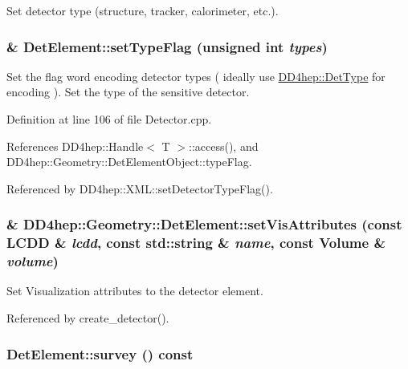 Set detector type (structure, tracker, calorimeter, etc.). \hypertarget{class_d_d4hep_1_1_geometry_1_1_det_element_a5a03e88dd7e1e3f215116f44dfca1dce}{
\subsubsection[{setTypeFlag}]{ \& DetElement::setTypeFlag (unsigned int {\em types})}}
\label{class_d_d4hep_1_1_geometry_1_1_det_element_a5a03e88dd7e1e3f215116f44dfca1dce}


Set the flag word encoding detector types ( ideally use \hyperlink{class_d_d4hep_1_1_det_type}{DD4hep::DetType} for encoding ). Set the type of the sensitive detector. 

Definition at line 106 of file Detector.cpp.

References DD4hep::Handle$<$ T $>$::access(), and DD4hep::Geometry::DetElementObject::typeFlag.

Referenced by DD4hep::XML::setDetectorTypeFlag().\hypertarget{class_d_d4hep_1_1_geometry_1_1_det_element_acdd370a4a20bc97cc7d9534f5e1fe91b}{
\subsubsection[{setVisAttributes}]{\& DD4hep::Geometry::DetElement::setVisAttributes (const {\bf LCDD} \& {\em lcdd}, \/  const std::string \& {\em name}, \/  const {\bf Volume} \& {\em volume})}}
\label{class_d_d4hep_1_1_geometry_1_1_det_element_acdd370a4a20bc97cc7d9534f5e1fe91b}


Set Visualization attributes to the detector element. 

Referenced by create\_\-detector().\hypertarget{class_d_d4hep_1_1_geometry_1_1_det_element_a7656d819ab427f168ece0940353055f9}{
\subsubsection[{survey}]{ DetElement::survey () const}}
\label{class_d_d4hep_1_1_geometry_1_1_det_element_a7656d819ab427f168ece0940353055f9}


